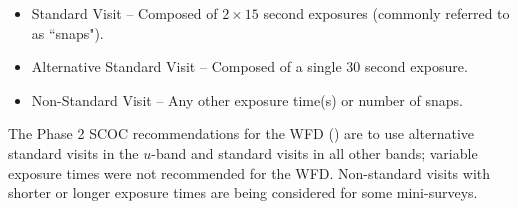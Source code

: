 \begin{itemize}
\item Standard Visit -- Composed of $2\times15$ second exposures (commonly referred to as ``snaps").
\item Alternative Standard Visit -- Composed of a single $30$ second exposure.
\item Non-Standard Visit -- Any other exposure time(s) or number of snaps.
\end{itemize}

The Phase 2 SCOC recommendations for the WFD () are to 
use alternative standard visits in the $u$-band and standard visits in all 
other bands; variable exposure times were not recommended for the WFD. 
Non-standard visits with shorter or longer exposure times are being 
considered for some mini-surveys.
